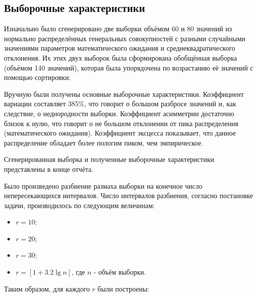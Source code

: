 \subsection{Выборочные характеристики}

Изначально было сгенерировано две выборки объёмом 60 и 80 значений из нормально распределённых генеральных совокупностей с разными случайными значениями параметров математического ожидания и среднеквадратического отклонения. Их этих двух выборок была сформирована обобщённая выборка (объёмом 140 значений), которая была упорядочена по возрастанию её значений с помощью сортировки.

Вручную были получены основные выборочные характеристики. Коэффициент вариации составляет 385\%, что говорит о большом разбросе значений и, как следствие, о неднородности выборки. Коэффициент асимметрии достаточно близок к нулю, что говорит о не большом отклонении от пика распределения (математического ожидания). Коэффициент эксцесса показывает, что данное распределение обладает более пологим пиком, чем эмпирическое.

Сгенерированная выборка и полученные выборочные характеристики представлены в конце отчёта.

Было произведено разбиение размаха выборки на конечное число непересекающихся интервалов. Число интервалов разбиения, согласно постановке задачи, производилось по следующим величинам:

\begin{itemize}
	\item $r = 10$;
	\item $r = 20$;
	\item $r = 30$;
	\item $r = [ 1 + 3.2 \lg{n} ]$, где $n$ - объём выборки.
\end{itemize}

Таким образом, для каждого $r$ были построены:

